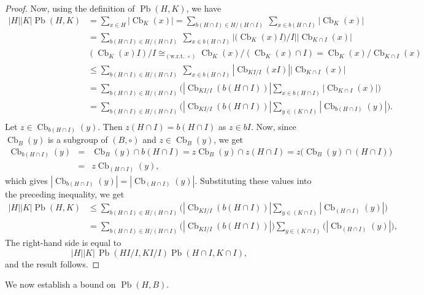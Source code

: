 \documentclass[10pt,a4paper]{amsart}
\numberwithin{equation}{section}
\newcommand{\Cb}{\operatorname{Cb} }
\newcommand{\Pb}{\operatorname{Pb} }
\begin{document}
\begin{proof}
Now, using the definition of $\Pb(H,K)$, we have
\begin{align*}
  |H||K|\Pb(H,K) &=\sum_{x\in H}|\Cb_{K}(x)| =\sum_{b (H\cap I)\in{H/(H\cap I)}} ~ \sum_{x\in b (H\cap I)}|\Cb_{K}(x)|\\
             &=\sum_{b (H\cap I)\in{H/(H\cap I)}} ~ \sum_{x\in b (H\cap I)}|{(\Cb_{K}(x) I})/I||\Cb_{K\cap I}(x)|\\
             &(\Cb_{K}(x) I)/I \cong_{(\text{w.r.t. }\circ)} \Cb_K(x)/(\Cb_K(x) \cap I) = \Cb_K(x)/\Cb_{K\cap I}(x)\\
             &\leqslant \sum_{b (H\cap I)\in{H/(H\cap I)}} ~ \sum_{x\in b (H\cap I)}|\Cb_{KI/I}(x I)| |\Cb_{K\cap I}(x)|\\  
             &= \sum_{b (H\cap I)\in{H/(H\cap I)}}\Big(|\Cb_{KI/I}(b (H\cap I))|\sum_{x\in b (H\cap I)}|\Cb_{K\cap I}(x)|\Big)\\   
             &= \sum_{b (H\cap I)\in{H/(H\cap I)}}\Big(|\Cb_{KI/I}(b (H\cap I))| \sum_{y\in (K\cap I)}|\Cb_{b (H\cap I)}(y)|\Big).\\                      
      \end{align*}
      Let $z \in   \Cb_{b (H\cap I)}(y)$.  Then $z  (H\cap I) = b (H\cap I)$ as $z \in b  I$. Now, since $\Cb_{B}(y)$ is a subgroup of $(B, \circ)$ and $z \in \Cb_B(y)$, we get
    \begin{eqnarray*}
        \Cb_{b (H\cap I)}(y) &=&\Cb_{B}(y)\cap b (H\cap I) = z \Cb_{B}(y) \cap z (H\cap I) = z \big(\Cb_{B}(y)\cap (H\cap I)\big)\\
        &=& z   \Cb_{(H\cap I)}(y),
        \end{eqnarray*}
     which gives $|\Cb_{b (H\cap I)}(y)| = |\Cb_{(H\cap I)}(y)|$. Substituting these values into the preceding inequality, we get
    \begin{align*}
        |H||K|\Pb(H,K)  &\leqslant \sum_{b (H\cap I)\in{H/(H\cap I)}}\Big(|\Cb_{KI/I}(b (H\cap I))| \sum_{y\in (K\cap I)}|\Cb_{(H\cap I)}(y)|\Big)\\
        &= \sum_{b (H\cap I)\in{H/(H\cap I)}}\big(|\Cb_{KI/I}(b (H\cap I))|\big) \sum_{y\in (K\cap I)}\big(|\Cb_{(H\cap I)}(y)|\big),
    \end{align*}
    The right-hand side is equal to
    $$
    |H||K|\,\Pb(HI/I,KI/I)\Pb(H\cap I,K\cap I),
    $$
    and the result follows.
\end{proof}
    

 We now establish a bound on  $\Pb (H,B)$.
      
\end{document}
